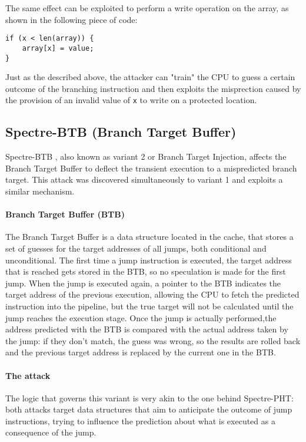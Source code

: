 \documentclass[12pt,a4paper]{book}
\theoremstyle{definition}
\begin{document}
	The same effect can be exploited to perform a write operation on the array, as shown in the following piece of code:
	\begin{lstlisting}
if (x < len(array)) { 
	array[x] = value; 
}
	\end{lstlisting}  
	Just as the described above, the attacker can "train" the CPU to guess a certain outcome of the branching instruction and then exploits the misprection caused by the provision of an invalid value of \texttt{x} to write on a protected location.
	\subsection{Spectre-BTB (Branch Target Buffer)}
	Spectre-BTB \cite{Kocher2019} \cite{Canella2019}, also known as variant 2 or Branch Target Injection, affects the Branch Target Buffer to deflect the transient execution to a mispredicted branch target. This attack was discovered simultaneously to variant 1 and exploits a similar mechanism.
	
	\paragraph{Branch Target Buffer (BTB)} The Branch Target Buffer \cite{Perleberg1989} is a data structure located in the cache, that stores a set of guesses for the target addresses of all jumps, both conditional and unconditional. The first time a jump instruction is executed, the target address that is reached gets stored in the BTB, so no speculation is made for the first jump. When the jump is executed again, a pointer to the BTB indicates the target address of the previous execution, allowing the CPU to fetch the  predicted instruction into the pipeline, but the true target will not be calculated until the jump reaches the execution stage. Once the jump is actually performed,the address predicted with the BTB is compared with the actual address taken by the jump: if they don't match, the guess was wrong, so the results are rolled back and the previous target address is replaced by the current one in the BTB.
	\paragraph{The attack} The logic that governs this variant is very akin to the one behind Spectre-PHT: both attacks target data structures that aim to anticipate the outcome of jump instructions, trying to influence the prediction about what is executed as a consequence of the jump.
	
\end{document}
